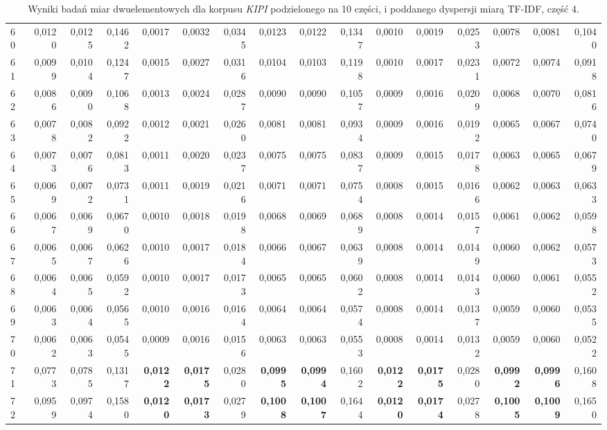 \begin{table}[htp!]
\begin{adjustwidth}{-2cm}{}
\begin{tabular}{ l | *{15}{| r}}
60	&	0,0120	&	0,0125	&	0,1462	&	0,0017	&	0,0032	&	0,0345	&	0,0123	&	0,0122	&	0,1347	&	0,0010	&	0,0019	&	0,0253	&	0,0078	&	0,0081	&	0,1040	\\
61	&	0,0099	&	0,0104	&	0,1247	&	0,0015	&	0,0027	&	0,0316	&	0,0104	&	0,0103	&	0,1198	&	0,0010	&	0,0017	&	0,0231	&	0,0072	&	0,0074	&	0,0918	\\
62	&	0,0086	&	0,0090	&	0,1068	&	0,0013	&	0,0024	&	0,0287	&	0,0090	&	0,0090	&	0,1057	&	0,0009	&	0,0016	&	0,0209	&	0,0068	&	0,0070	&	0,0816	\\
63	&	0,0078	&	0,0082	&	0,0922	&	0,0012	&	0,0021	&	0,0260	&	0,0081	&	0,0081	&	0,0934	&	0,0009	&	0,0016	&	0,0192	&	0,0065	&	0,0067	&	0,0740	\\
64	&	0,0073	&	0,0076	&	0,0813	&	0,0011	&	0,0020	&	0,0237	&	0,0075	&	0,0075	&	0,0837	&	0,0009	&	0,0015	&	0,0178	&	0,0063	&	0,0065	&	0,0679	\\
65	&	0,0069	&	0,0072	&	0,0731	&	0,0011	&	0,0019	&	0,0216	&	0,0071	&	0,0071	&	0,0754	&	0,0008	&	0,0015	&	0,0166	&	0,0062	&	0,0063	&	0,0633	\\
66	&	0,0067	&	0,0069	&	0,0670	&	0,0010	&	0,0018	&	0,0198	&	0,0068	&	0,0069	&	0,0689	&	0,0008	&	0,0014	&	0,0157	&	0,0061	&	0,0062	&	0,0598	\\
67	&	0,0065	&	0,0067	&	0,0626	&	0,0010	&	0,0017	&	0,0184	&	0,0066	&	0,0067	&	0,0639	&	0,0008	&	0,0014	&	0,0149	&	0,0060	&	0,0062	&	0,0573	\\
68	&	0,0064	&	0,0065	&	0,0592	&	0,0010	&	0,0017	&	0,0173	&	0,0065	&	0,0065	&	0,0602	&	0,0008	&	0,0014	&	0,0143	&	0,0060	&	0,0061	&	0,0552	\\
69	&	0,0063	&	0,0064	&	0,0565	&	0,0010	&	0,0016	&	0,0164	&	0,0064	&	0,0064	&	0,0574	&	0,0008	&	0,0014	&	0,0137	&	0,0059	&	0,0060	&	0,0535	\\
70	&	0,0062	&	0,0063	&	0,0545	&	0,0009	&	0,0016	&	0,0156	&	0,0063	&	0,0063	&	0,0553	&	0,0008	&	0,0014	&	0,0132	&	0,0059	&	0,0060	&	0,0522	\\
71	&	0,0773	&	0,0785	&	0,1317	&	\textbf{0,0122}	&	\textbf{0,0175}	&	0,0280	&	\textbf{0,0995}	&	\textbf{0,0994}	&	0,1602	&	\textbf{0,0122}	&	\textbf{0,0175}	&	0,0280	&	\textbf{0,0992}	&	\textbf{0,0996}	&	0,1608	\\
72	&	0,0959	&	0,0974	&	0,1580	&	\textbf{0,0120}	&	\textbf{0,0173}	&	0,0279	&	\textbf{0,1008}	&	\textbf{0,1007}	&	0,1644	&	\textbf{0,0120}	&	\textbf{0,0174}	&	0,0278	&	\textbf{0,1005}	&	\textbf{0,1009}	&	0,1650	\\
	\bottomrule
\end{tabular}
 \end{adjustwidth}
\caption[Wyniki badań miar dwuelementowych dla korpusu \emph{KIPI} podzielonego na 10 części, i poddanego dyspersji miarą TF-IDF, część 4]{Wyniki badań miar dwuelementowych dla korpusu \emph{KIPI} podzielonego na 10 części, i poddanego dyspersji miarą TF-IDF, część 4.}
\label{KIPI_TFIDF_10_part_4}
\end{table}

